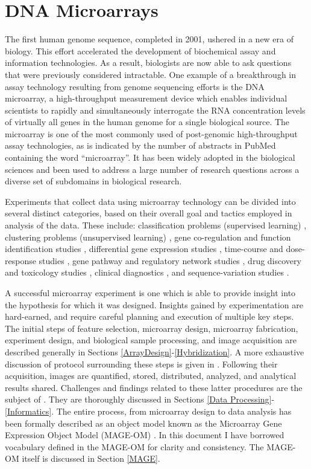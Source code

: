 \section{DNA Microarrays}

The first human genome sequence, completed in 2001, ushered in a new era of
biology.  This effort accelerated the development of biochemical assay and
information technologies.  As a result, biologists are now able to ask
questions that were previously considered intractable.  One example of a
breakthrough in assay technology resulting from genome sequencing efforts is
the DNA microarray, a high-throughput measurement device which enables
individual scientists to rapidly and simultaneously interrogate the RNA
concentration levels of virtually all genes in the human genome for a single
biological source.  The microarray is one of the most commonly used of
post-genomic high-throughput assay technologies, as is indicated by the number
of abstracts in PubMed containing the word ``microarray''.  It has been widely
adopted in the biological sciences and been used to address a large number of
research questions across a diverse set of subdomains in biological research.

Experiments that collect data using microarray technology can be divided into
several distinct categories, based on their overall goal and tactics employed
in analysis of the data.  These include: classification problems (supervised
learning) \cite{Dudoit2003ICM}, clustering problems (unsupervised learning)
\cite{Azuaje2003cge,Stanford2003cac}, gene co-regulation and function
identification studies \cite{PMID_12413821}, differential gene expression
studies \cite{PMID_15843092,PMID_15867208}, time-course and dose-response
studies \cite{PMID_12443997}, gene pathway and regulatory network studies
\cite{PMID_16216773,PMID_16825123}, drug discovery and toxicology studies
\cite{PMID_16512775,PMID_16700885,PMID_16880944,PMID_17195470}, clinical
diagnostics \cite{PMID_16918486}, and sequence-variation studies
\cite{PMID_17265721}.

A successful microarray experiment is one which is able to provide insight into
the hypothesis for which it was designed.  Insights gained by experimentation
are hard-earned, and require careful planning and execution of multiple key
steps.  The initial steps of feature selection, microarray design, microarray
fabrication, experiment design, and biological sample processing, and image
acquisition are described generally in Sections
\ref{ArrayDesign}-\ref{Hybridization}.  A more exhaustive discussion of
protocol surrounding these steps is given in \cite{wit2004}.  Following their
acquisition, images are quantified, stored, distributed, analyzed, and
analytical results shared.  Challenges and findings related to these latter
procedures are the subject of \emph{\dbthesis}.  They are thoroughly discussed
in Sections \ref{Data Processing}-\ref{Informatics}.  The entire process, from
microarray design to data analysis has been formally described as an object
model known as the Microarray Gene Expression Object Model (MAGE-OM)
\cite{mage}.  In this document I have borrowed vocabulary defined in the
MAGE-OM for clarity and consistency.  The MAGE-OM itself is discussed in
Section \ref{MAGE}.

